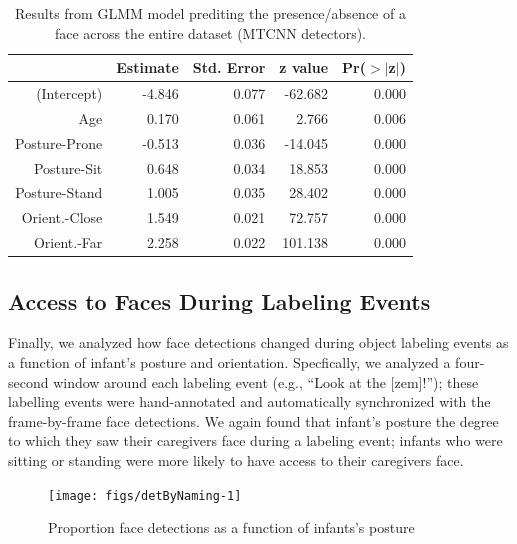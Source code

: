 \documentclass[10pt, letterpaper]{article}
\newenvironment{CodeChunk}{}{}
\begin{document}
\begin{table}[H]
\centering
\begin{tabular}{rrrrr}
  \hline
 & Estimate & Std. Error & z value & Pr($>$$|$z$|$) \\ 
  \hline
(Intercept) & -4.846 & 0.077 & -62.682 & 0.000 \\ 
  Age & 0.170 & 0.061 & 2.766 & 0.006 \\ 
  Posture-Prone & -0.513 & 0.036 & -14.045 & 0.000 \\ 
  Posture-Sit & 0.648 & 0.034 & 18.853 & 0.000 \\ 
  Posture-Stand & 1.005 & 0.035 & 28.402 & 0.000 \\ 
  Orient.-Close & 1.549 & 0.021 & 72.757 & 0.000 \\ 
  Orient.-Far & 2.258 & 0.022 & 101.138 & 0.000 \\ 
   \hline
\end{tabular}
\caption{Results from GLMM model prediting the presence/absence of a face across the entire dataset (MTCNN detectors).} 
\end{table}

\subsection{Access to Faces During Labeling
Events}\label{access-to-faces-during-labeling-events}

Finally, we analyzed how face detections changed during object labeling
events as a function of infant's posture and orientation. Specfically,
we analyzed a four-second window around each labeling event (e.g.,
``Look at the {[}zem{]}!''); these labelling events were hand-annotated
and automatically synchronized with the frame-by-frame face detections.
We again found that infant's posture the degree to which they saw their
caregivers face during a labeling event; infants who were sitting or
standing were more likely to have access to their caregivers face.

\begin{CodeChunk}
\begin{figure}[H]

{\centering \texttt{[image: figs/detByNaming-1]} 

}

\caption[Proportion face detections as a function of infants's posture]{Proportion face detections as a function of infants's posture}\label{fig:detByNaming}
\end{figure}
\end{CodeChunk}
\end{document}

